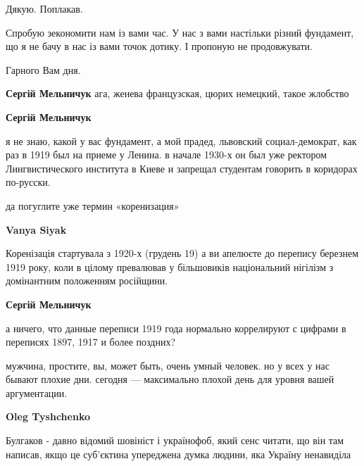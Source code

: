 \begin{itemize}
\begin{itemize}
Дякую. Поплакав.

Спробую зекономити нам із вами час. У нас з вами настільки різний фундамент, що
я не бачу в нас із вами точок дотику. І пропоную не продовжувати.

Гарного Вам дня.


\textbf{Сергій Мельничук} ага, женева французская, цюрих немецкий, такое жлобство

 
\textbf{Сергій Мельничук} 

я не знаю, какой у вас фундамент, а мой прадед, львовский социал-демократ, как
раз в 1919 был на приеме у Ленина. в начале 1930-х он был уже ректором
Лингвистического института в Киеве и запрещал студентам говорить в коридорах
по-русски.

да погуглите уже термин «коренизация»

 
\textbf{Vanya Siyak}

Коренізація стартувала з 1920-х (грудень 19) а ви апелюєте до перепису березнем
1919 року, коли в цілому превалював у більшовиків національний нігілізм з
домінантним положенням російщини.

 
\textbf{Сергій Мельничук} 

а ничего, что данные переписи 1919 года нормально коррелируют с цифрами в
переписях 1897, 1917 и более поздних?

мужчина, простите, вы, может быть, очень умный человек. но у всех у нас бывают
плохие дни. сегодня –– максимально плохой день для уровня вашей аргументации.

 
\textbf{Oleg Tyshchenko} 

Булгаков - давно відомий шовініст і українофоб, який сенс читати, що він там
написав, якщо це суб'єктина упереджена думка людини, яка Україну ненавиділа


\end{itemize}
\end{itemize}
